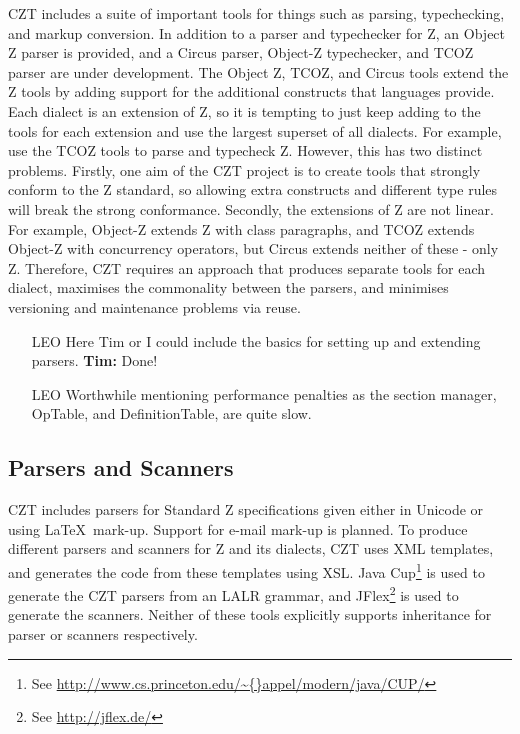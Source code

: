 \documentclass{llncs}
\begin{document}
  CZT includes a suite of important tools for things such as parsing,
  typechecking, and markup conversion. In addition to a parser and
  typechecker for Z, an Object Z parser is provided, and a Circus
  parser, Object-Z typechecker, and TCOZ parser are under development.
  The Object Z, TCOZ, and Circus tools extend the Z tools by adding
  support for the additional constructs that languages provide.  Each
  dialect is an extension of Z, so it is tempting to just keep adding
  to the tools for each extension and use the largest superset of all
  dialects. For example, use the TCOZ tools to parse and typecheck
  Z. However, this has two distinct problems. Firstly, one aim of the
  CZT project is to create tools that strongly conform to the Z
  standard, so allowing extra constructs and different type rules will
  break the strong conformance. Secondly, the extensions of Z are not
  linear. For example, Object-Z extends Z with class paragraphs, and
  TCOZ extends Object-Z with concurrency operators, but Circus extends
  neither of these - only Z. Therefore, CZT requires an approach that
  produces separate tools for each dialect, maximises the commonality
  between the parsers, and minimises versioning and maintenance
  problems via reuse.


  \begin{itemize}
    \item[LEO] Here Tim or I could include the basics for setting up
               and extending parsers. {\bf Tim:} Done!
    \item[LEO] Worthwhile mentioning performance penalties as the
               section manager, OpTable, and DefinitionTable, are
               quite slow.
  \end{itemize}


\subsection{Parsers and Scanners}

  CZT includes parsers for Standard Z specifications given either in
  Unicode or using \LaTeX\ mark-up.  Support for e-mail mark-up is
  planned. To produce different parsers and scanners for Z and its
  dialects, CZT uses XML templates, and generates the code from these
  templates using XSL. Java Cup\footnote{See
  \url{http://www.cs.princeton.edu/\~{}appel/modern/java/CUP/}} is
  used to generate the CZT parsers from an LALR grammar, and
  JFlex\footnote{See \url{http://jflex.de/}} is used to generate the
  scanners. Neither of these tools explicitly supports inheritance for
  parser or scanners respectively.
\end{document}
